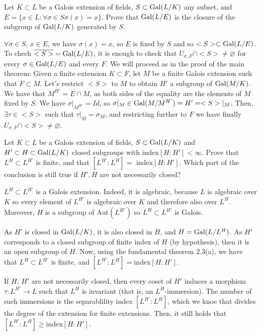 \begin{ex}

\end{ex}

\begin{ex}
	Let $K \subset L$ be a Galois extension of fields, $S \subset \mathrm{Gal}(L/K)$ any subset, and $E = \{x \in L : \forall \sigma \in S \sigma(x) = x\}$. Prove that $\mathrm{Gal}(L/E)$ is the closure of the subgroup of $\mathrm{Gal}(L/K)$ generated by $S$.
\end{ex}

\begin{sol}
	$\forall \sigma \in S, \, x \in E$, we have $\sigma(x) = x$, so $E$ is fixed by $S$ and so $<S> \subset \mathrm{Gal}(L/E)$. To chech $\overline{<S>} = \mathrm{Gal}(L/E)$, it is enough to check that $U_{\sigma,F} \cap <S> \neq \varnothing$ for every $\sigma \in \mathrm{Gal}(L/E)$ and every $F$. We will proceed as in the proof of the main theorem: Given a finite extension $K \subset F$, let $M$ be a finite Galois extension such that $F \subset M$. Let's restrict $<S>$ to $M$ to obtain $H'$ a subgroup of $\mathrm{Gal}(M/K)$. We have that $M^{H'} = E \cap M$, as both sides of the equality are the elements of $M$ fixed by $S$. We have $\sigma|_{M^{H'}} = Id$, so $\sigma|_M \in \mathrm{Gal}(M/M^{H'}) = H' = <S>|_M$.  Then, $\exists \tau \in <S>$ such that $\tau|_M = \sigma_M$, and restricting further to $F$ we have finally $U_{\sigma, F} \cap <S> \neq \varnothing$.
\end{sol}

\begin{ex}
	Let $K \subset L$ be a Galois extension of fields, $S \subset \mathrm{Gal}(L/K)$ and $H' \subset H \subset \mathrm{Gal}(L/K)$ closed subgroups with index$[H:H'] < \infty$. Prove that $L^H \subset L^{H'}$ is finite, and that $[L^{H'} : L^{H}] = $ index$[H:H']$. Which part of the conclusion is still true if $H', H$ are not necessarily closed?
\end{ex}

\begin{sol}
	$L^H \subset L^{H'}$ is a Galois extension. Indeed, it is algebraic, because $L$ is algebraic over $K$ so every element of $L^{H'}$ is algebraic over $K$ and therefore also over $L^{H}$. Moreover, $H$ is a subgroup of $\mathrm{Aut}(L^{H'})$ so $L^H \subset L^{H'}$ is Galois.

	As $H'$ is closed in $\mathrm{Gal}(L/K)$, it is also closed in $H$, and $H = \mathrm{Gal}(L/L^H)$. As $H'$ corresponds to a closed subgroup of finite index of $H$ (by hypothesis), then it is an open subgroup of $H$. Now, using the fundamental theorem 2.3(a), we have that $L^H \subset L^{H'}$ is finite, and $[L^{H'} : L^H] = \text{index}[H:H']$.

	If $H$, $H'$ are not necessarily closed, then every coset of $H'$ induces a morphism $\tau: L^{H'} \to L$ such that $L^H$ is invariant (that is, an $L^H$-immersion). The number of such immersions is the separablility index $[L^{H'}:L^{H}]$, which we knoe that divides the degree of the extension for finite extensions. Then, it still holds that $[L^{H'}:L^H] \geq \text{index}[H:H']$.
\end{sol}

